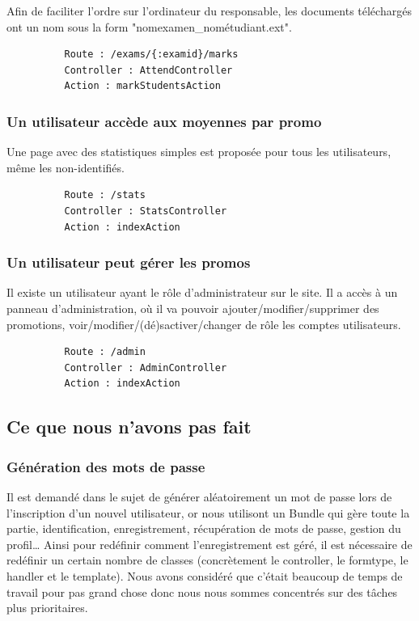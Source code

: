 \documentclass{report}
\begin{document}
        Afin de faciliter l'ordre sur l'ordinateur du responsable, les documents
        téléchargés ont un nom sous la form "nomexamen\_nométudiant.ext".

        \begin{verbatim}
          Route : /exams/{:examid}/marks
          Controller : AttendController
          Action : markStudentsAction
        \end{verbatim}
      \subsubsection{Un utilisateur accède aux moyennes par promo}
        Une page avec des statistiques simples est proposée pour tous les utilisateurs,
        même les non-identifiés.

        \begin{verbatim}
          Route : /stats
          Controller : StatsController
          Action : indexAction
        \end{verbatim}
      \subsubsection{Un utilisateur peut gérer les promos}
        Il existe un utilisateur ayant le rôle d'administrateur sur le site. Il
        a accès à un panneau d'administration, où il va pouvoir 
        ajouter/modifier/supprimer des promotions, voir/modifier/(dé)sactiver/changer de rôle
        les comptes utilisateurs.

        \begin{verbatim}
          Route : /admin
          Controller : AdminController
          Action : indexAction
        \end{verbatim}
    \subsection{Ce que nous n'avons pas fait}
      \subsubsection{Génération des mots de passe}
        Il est demandé dans le sujet de générer aléatoirement un mot de passe lors 
        de l'inscription d'un nouvel utilisateur, or nous utilisont un Bundle qui 
        gère toute la partie, identification, enregistrement, récupération de mots
        de passe, gestion du profil… Ainsi pour redéfinir comment l'enregistrement
        est géré, il est nécessaire de redéfinir un certain nombre de classes
        (concrètement le controller, le formtype, le handler et le template). Nous
        avons considéré que c'était beaucoup de temps de travail pour pas grand
        chose donc nous nous sommes concentrés sur des tâches plus prioritaires.
\end{document}
